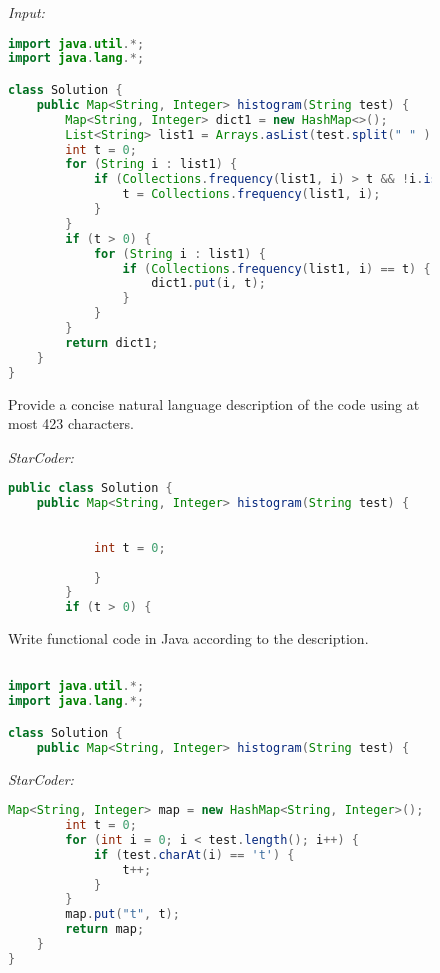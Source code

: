 \begin{figure}[htbp]
\hrulefill

\emph{Input:}

\hrulefill

\begin{lstlisting}[language=Java,breaklines=true,basicstyle=\ttfamily\scriptsize]
import java.util.*;
import java.lang.*;

class Solution {
    public Map<String, Integer> histogram(String test) {
        Map<String, Integer> dict1 = new HashMap<>();
        List<String> list1 = Arrays.asList(test.split(" " ));
        int t = 0;
        for (String i : list1) {
            if (Collections.frequency(list1, i) > t && !i.isEmpty()) {
                t = Collections.frequency(list1, i);
            }
        }
        if (t > 0) {
            for (String i : list1) {
                if (Collections.frequency(list1, i) == t) {
                    dict1.put(i, t);
                }
            }
        }
        return dict1;
    }
}
\end{lstlisting}

Provide a concise natural language description of the code using at most 423 characters.


\hrulefill

\emph{StarCoder:}

\hrulefill

\begin{lstlisting}[language=Java,breaklines=true,basicstyle=\ttfamily\scriptsize]
public class Solution {
    public Map<String, Integer> histogram(String test) {
        
            
            int t = 0;
    
            }   
        }
        if (t > 0) {
\end{lstlisting}
Write functional code in Java according to the description.

\hrulefill

\begin{lstlisting}[language=Java,breaklines=true,basicstyle=\ttfamily\scriptsize]

import java.util.*;
import java.lang.*;

class Solution {
    public Map<String, Integer> histogram(String test) {
\end{lstlisting}

\hrulefill

\emph{StarCoder:}


\begin{lstlisting}[language=Java,breaklines=true,basicstyle=\ttfamily\scriptsize]
        Map<String, Integer> map = new HashMap<String, Integer>();
        int t = 0;
        for (int i = 0; i < test.length(); i++) {
            if (test.charAt(i) == 't') {
                t++;
            }
        }
        map.put("t", t);
        return map;
    }
}
\end{lstlisting}


\end{figure}
